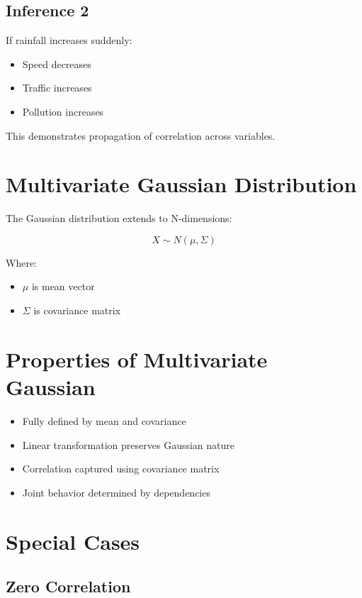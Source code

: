 \documentclass[11pt]{article}
\begin{document}
\subsection{Inference 2}

If rainfall increases suddenly:

\begin{itemize}
\item Speed decreases
\item Traffic increases
\item Pollution increases
\end{itemize}

This demonstrates propagation of correlation across variables.

\section{Multivariate Gaussian Distribution}

The Gaussian distribution extends to N-dimensions:

\[
X \sim N(\mu, \Sigma)
\]

Where:

\begin{itemize}
\item $\mu$ is mean vector
\item $\Sigma$ is covariance matrix
\end{itemize}

\section{Properties of Multivariate Gaussian}

\begin{itemize}
\item Fully defined by mean and covariance
\item Linear transformation preserves Gaussian nature
\item Correlation captured using covariance matrix
\item Joint behavior determined by dependencies
\end{itemize}

\section{Special Cases}

\subsection{Zero Correlation}
\end{document}
